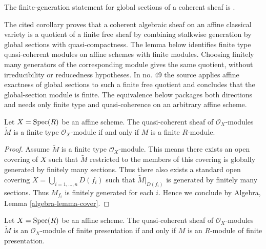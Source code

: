 \begin{lemma}
\label{lemma-finite-type-module}
\begin{reference}
\cite[Chapter II, \S 3, no. 45, Theorem 2, Corollary 1,
p. 238]{FAC}
The finite-generation statement for global sections of a coherent sheaf is
\cite[Chapter II, \S 4, no. 49, opening paragraph, p. 241]{FAC}.
\end{reference}
\begin{history}
The cited corollary proves that a coherent algebraic sheaf on an affine
classical variety is a quotient of a finite free sheaf by combining stalkwise
generation by global sections with quasi-compactness. The lemma below
identifies finite type quasi-coherent modules on affine schemes with finite
modules. Choosing finitely many generators of the corresponding module gives
the same quotient, without irreducibility or reducedness hypotheses. In
no. 49 the source applies affine exactness of global sections to such a
finite free quotient and concludes that the global-section module is finite.
The equivalence below packages both directions and needs only finite type and
quasi-coherence on an arbitrary affine scheme.
\end{history}
Let $X = \mathop{\mathrm{Spec}}(R)$ be an affine scheme.
The quasi-coherent sheaf of $\mathcal{O}_X$-modules
$\widetilde M$ is a finite type $\mathcal{O}_X$-module
if and only if $M$ is a finite $R$-module.
\end{lemma}

\begin{proof}
Assume $\widetilde M$ is a finite type $\mathcal{O}_X$-module.
This means there exists an open covering of $X$ such that
$\widetilde M$ restricted to the members of this covering is
globally generated by finitely many sections.
Thus there also exists a standard open covering
$X = \bigcup_{i = 1, \ldots, n} D(f_i)$ such that $\widetilde M|_{D(f_i)}$
is generated by finitely many sections. Thus $M_{f_i}$ is finitely
generated for each $i$. Hence we conclude by
Algebra, Lemma \ref{algebra-lemma-cover}.
\end{proof}

\begin{lemma}
\label{lemma-finite-presentation-module}
Let $X = \mathop{\mathrm{Spec}}(R)$ be an affine scheme. The quasi-coherent sheaf
of $\mathcal{O}_X$-modules $\widetilde M$ is an $\mathcal{O}_X$-module of
finite presentation if and only if $M$ is an $R$-module of finite presentation.
\end{lemma}

